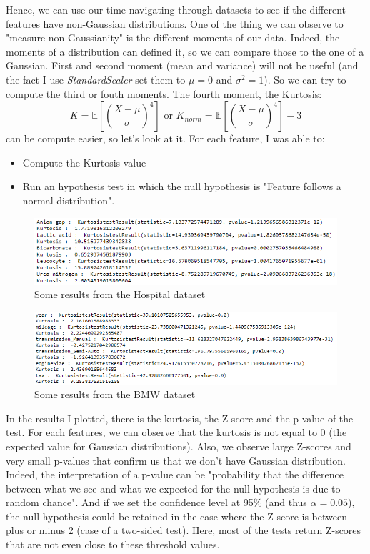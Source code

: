 \documentclass[15pt]{article}
\begin{document}
\begin{multicols}{2}
Hence, we can use our time navigating through datasets to see if the different features have non-Gaussian distributions. One of the thing we can observe to "measure non-Gaussianity" is the different moments of our data. Indeed, the moments of a distribution can defined it, so we can compare those to the one of a Gaussian. First and second moment (mean and variance) will not be useful (and the fact I use \textit{StandardScaler} set them to $\mu = 0$ and $\sigma^2=1$). So we can try to compute the third or fouth moments. The fourth moment, the Kurtosis:
$$ K = \mathbb{E}\left[ \left( \frac{X-\mu}{\sigma} \right)^4 \right] \text{ or } K_{norm} = \mathbb{E}\left[ \left( \frac{X-\mu}{\sigma} \right)^4 \right] - 3$$
can be compute easier, so let's look at it. 
For each feature, I was able to:
\begin{itemize}
\item Compute the Kurtosis value
\item Run an hypothesis test in which the null hypothesis is "Feature follows a normal distribution".
\end{itemize}

\begin{figure}[H]
\centering
\includegraphics[width = \columnwidth]{Capture2.png}
\caption{Some results from the Hospital dataset}
\end{figure}

\begin{figure}[H]
\centering
\includegraphics[width = \columnwidth]{Capture3.png}
\caption{Some results from the BMW dataset}
\end{figure}

In the results I plotted, there is the kurtosis, the Z-score and the p-value of the test. For each features, we can observe that the kurtosis is not equal  to 0 (the expected value for Gaussian distributions). Also, we observe large Z-scores and very small p-values that confirm us that we don't have Gaussian distribution. Indeed, the interpretation of a p-value can be "probability that the difference between what we see and what we expected for the null hypothesis is due to random chance". And if we set the confidence level at 95\% (and thus $\alpha=0.05$), the null hypothesis could be retained in the case where the Z-score is between plus or minus 2 (case of a two-sided test). Here, most of the tests return Z-scores that are not even close to these threshold values.


\end{multicols}
\end{document}
